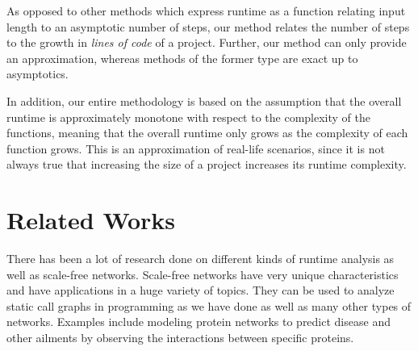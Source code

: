 \documentclass[11pt,a4paper,twocolumn]{article}
\begin{document}
\begin{singlespace}
As opposed to other methods which express runtime as a function relating input
length to an asymptotic number of steps, our method relates the number of steps
to the growth in \emph{lines of code} of a project. Further, our method can
only provide an approximation, whereas methods of the former type are exact
up to asymptotics.

In addition, our entire methodology is based on the assumption that the overall
runtime is approximately monotone with respect to the complexity of the
functions, meaning that the overall runtime only grows as the complexity of
each function grows. This is an approximation of real-life scenarios, since
it is not always true that increasing the size of a project increases its
runtime complexity.

\section{Related Works}

There has been a lot of research done on different kinds of runtime analysis as
well as scale-free networks. Scale-free networks have very unique characteristics
and have applications in a huge variety of topics. They can be used to analyze
static call graphs in programming as we have done as well as many other types
of networks. Examples include modeling protein networks to predict disease and
other ailments by observing the interactions between specific proteins.


\newpage
\printbibliography[title={References}]


\end{singlespace}
\end{document}
